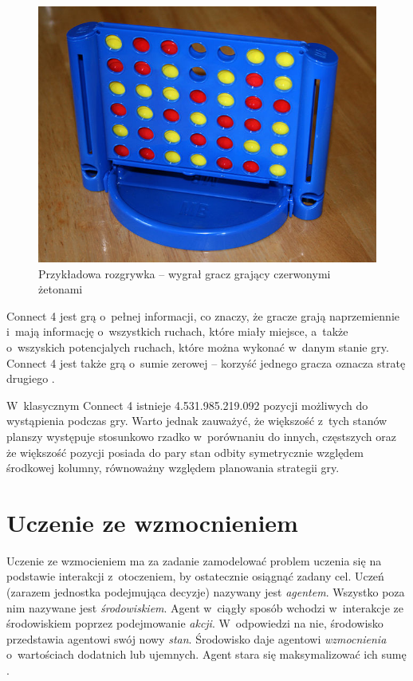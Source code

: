 \documentclass[a4paper, 12pt, oneside]{report}
\begin{document}
\begin{figure}[htp]
\centering
\includegraphics[scale=0.35]{connect4_plansza.jpg}
\caption{Przykładowa rozgrywka -- wygrał gracz grający czerwonymi żetonami\protect\footnotemark}
\label{fig:plansza}
\end{figure}
 
Connect 4 jest grą o~pełnej informacji, co znaczy, że gracze grają naprzemiennie i~mają informację o~wszystkich ruchach, które miały miejsce, a~także o~wszyskich potencjalych ruchach, które można wykonać w~danym stanie gry. Connect 4 jest także grą o~sumie zerowej -- korzyść jednego gracza oznacza stratę drugiego \cite{wiki:ConnectFour}.

 W~klasycznym Connect 4 istnieje 4.531.985.219.092 \cite{EdelkampKissmann} pozycji możliwych do wystąpienia podczas gry. Warto jednak zauważyć, że większość z~tych stanów planszy występuje stosunkowo rzadko w~porównaniu do innych, częstszych oraz że większość pozycji posiada do pary stan odbity symetrycznie względem środkowej kolumny, równoważny względem planowania strategii gry.

\chapter{Uczenie ze wzmocnieniem}

Uczenie ze wzmocieniem ma za zadanie zamodelować problem uczenia się na podstawie interakcji z~otoczeniem, by ostatecznie osiągnąć zadany cel. Uczeń (zarazem jednostka podejmująca decyzje) nazywany jest \emph{agentem}. Wszystko poza nim nazywane jest \emph{środowiskiem}. Agent w~ciągły sposób wchodzi w~interakcje ze środowiskiem poprzez podejmowanie \emph{akcji}. W~odpowiedzi na nie, środowisko przedstawia agentowi swój nowy \emph{stan}. Środowisko daje agentowi \emph{wzmocnienia} o~wartościach dodatnich lub ujemnych. Agent stara się maksymalizować ich sumę \cite{SuttonBarto98}.
\end{document}
